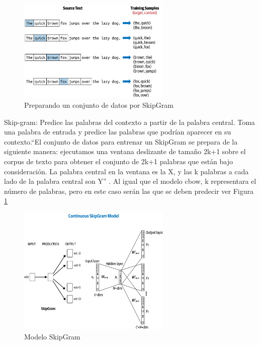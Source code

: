 \begin{itemize}
\begin{itemize}
\begin{figure}[h!]
	\includegraphics[width=0.65\textwidth]{capitulo3/figuras/nlp5.png}
	\caption{Preparando un conjunto de datos por SkipGram}
	\label{fig:nlp5}
\end{figure}

Skip-gram: Predice las palabras del contexto a partir de la palabra central. Toma una palabra de entrada y predice las palabras que podrían aparecer en su contexto.``El conjunto de datos para entrenar un SkipGram se prepara de la siguiente manera: ejecutamos una ventana deslizante de tamaño 2k+1 sobre el corpus de texto para obtener el conjunto de 2k+1 palabras que están bajo consideración. La palabra central en la ventana es la X, y las k palabras a cada lado de la palabra central son Y'' \cite[p. 101]{vajjala2020practical}. Al igual que el modelo cbow, k representara el número de palabras, pero en este caso serán las que se deben predecir ver Figura \ref{fig:nlp5}



\begin{figure}
	\includegraphics[width=0.65\textwidth]{capitulo3/figuras/nlp6.png}
	\caption{Modelo SkipGram}
	\label{fig:nlp6}
\end{figure}


\end{itemize}
\end{itemize}
